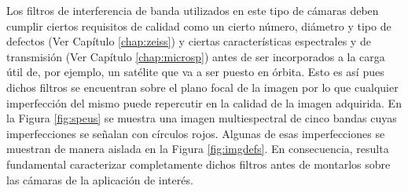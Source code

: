 \begin{figure}[H]
	\begin{floatrow}
	\end{floatrow}
\end{figure}

 Los filtros de interferencia de banda 
utilizados en este tipo de cámaras deben cumplir ciertos requisitos de calidad como un cierto número, diámetro y tipo de defectos (Ver Capítulo \ref{chap:zeiss}) y ciertas características espectrales y de transmisión (Ver Capítulo \ref{chap:microsp}) antes de ser 
incorporados a la carga útil de, por ejemplo, un satélite que va a ser puesto 
en 
órbita. Esto es así pues dichos filtros se encuentran sobre el plano focal de la imagen por lo que cualquier imperfección del mismo puede repercutir en la calidad de la imagen adquirida. En la Figura \ref{fig:speus} se muestra una imagen multiespectral de cinco bandas cuyas imperfecciones se señalan con círculos rojos. Algunas de esas imperfecciones se muestran de manera aislada en la Figura \ref{fig:imgdefs}. En consecuencia, resulta fundamental caracterizar completamente dichos filtros antes de montarlos sobre las cámaras de la aplicación de interés.

